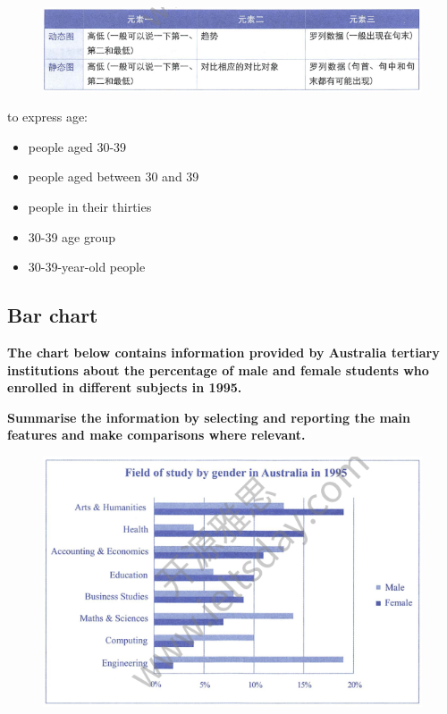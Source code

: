\documentclass[conference]{IEEEtran}
\begin{document}
\begin{figure}[htbp]
    \centerline{\includegraphics[width=1.1\columnwidth]{images/Screenshot from 2022-12-05 11-00-46.png}}
\end{figure}

to express age:
\begin{itemize}
    \item people aged 30-39
    \item people aged between 30 and 39
    \item people in their thirties
    \item 30-39 age group
    \item 30-39-year-old people
\end{itemize}

\subsection{Bar chart}

\textbf{The chart below contains information provided by Australia tertiary institutions about the
percentage of male and female students who enrolled in different subjects in 1995.}

\textbf{Summarise the information by selecting and reporting the main features and make
comparisons where relevant.}

\begin{figure}[htbp]
    \centerline{\includegraphics[width=1.0\columnwidth]{images/Screenshot from 2022-12-05 11-04-45.png}}
\end{figure}
\end{document}
